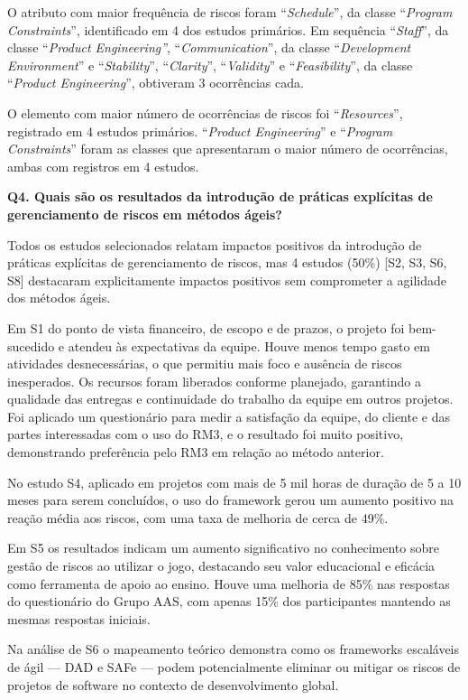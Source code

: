 \documentclass[
	12pt,
	openright,
	twoside,
	a4paper,
	english,
	brazil
	]{abntex2}
\begin{document}
O atributo com maior frequência de riscos foram “\textit{Schedule}”, da classe “\textit{Program Constraints}”, identificado em 4 dos estudos primários. Em sequência “\textit{Staff}”, da classe “\textit{Product Engineering”}, “\textit{Communication}”, da classe “\textit{Development Environment}” e “\textit{Stability}”, “\textit{Clarity}”, “\textit{Validity}” e “\textit{Feasibility}”, da classe “\textit{Product Engineering}”, obtiveram 3 ocorrências cada.

O elemento com maior número de ocorrências de riscos foi “\textit{Resources}”, registrado em 4 estudos primários. “\textit{Product Engineering}” e “\textit{Program Constraints}” foram as classes que apresentaram o maior número de ocorrências, ambas com registros em 4 estudos.

\textbf{Q4. Quais são os resultados da introdução de práticas explícitas de gerenciamento de riscos em métodos ágeis?}

Todos os estudos selecionados relatam impactos positivos da introdução de práticas explícitas de gerenciamento de riscos, mas 4 estudos (50\%) [S2, S3, S6, S8] destacaram explicitamente impactos positivos sem comprometer a agilidade dos métodos ágeis.

Em S1 do ponto de vista financeiro, de escopo e de prazos, o projeto foi bem-sucedido e atendeu às expectativas da equipe. Houve menos tempo gasto em atividades desnecessárias, o que permitiu mais foco e ausência de riscos inesperados. Os recursos foram liberados conforme planejado, garantindo a qualidade das entregas e continuidade do trabalho da equipe em outros projetos. Foi aplicado um questionário para medir a satisfação da equipe, do cliente e das partes interessadas com o uso do RM3, e o resultado foi muito positivo, demonstrando preferência pelo RM3 em relação ao método anterior.

No estudo S4, aplicado em projetos com mais de 5 mil horas de duração de 5 a 10 meses para serem concluídos, o uso do framework gerou um aumento positivo na reação média aos riscos, com uma taxa de melhoria de cerca de 49\%.

Em S5 os resultados indicam um aumento significativo no conhecimento sobre gestão de riscos ao utilizar o jogo, destacando seu valor educacional e eficácia como ferramenta de apoio ao ensino. Houve uma melhoria de 85\% nas respostas do questionário do Grupo AAS, com apenas 15\% dos participantes mantendo as mesmas respostas iniciais.

Na análise de S6 o mapeamento teórico demonstra como os frameworks escaláveis de ágil — DAD e SAFe — podem potencialmente eliminar ou mitigar os riscos de projetos de software no contexto de desenvolvimento global.
\end{document}

